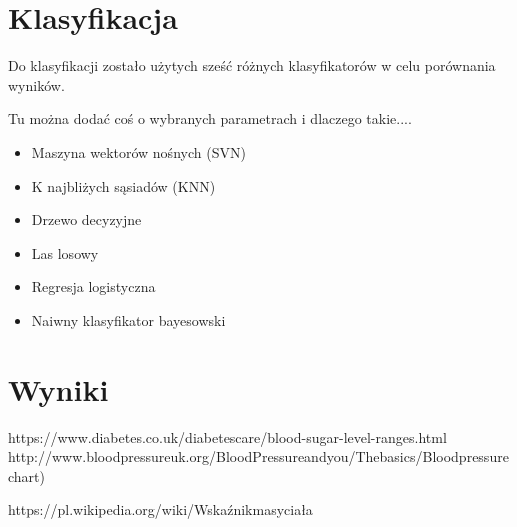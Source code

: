 \documentclass[12pt]{article}
\begin{document}
\section{Klasyfikacja}
	Do klasyfikacji zostało użytych sześć różnych klasyfikatorów w celu porównania wyników.

Tu można dodać coś o wybranych parametrach i dlaczego takie....

\begin{itemize}
\item{Maszyna wektorów nośnych (SVN)}
\item{K najbliżych sąsiadów (KNN)}
\item{Drzewo decyzyjne}
\item{Las losowy}
\item{Regresja logistyczna}
\item{Naiwny klasyfikator bayesowski}

\end{itemize}

\section{Wyniki}


\begin{thebibliography}{9}

	https://www.diabetes.co.uk/diabetescare/blood-sugar-level-ranges.html
	http://www.bloodpressureuk.org/BloodPressureandyou/Thebasics/Bloodpressurechart)

	https://pl.wikipedia.org/wiki/Wskaźnikmasyciała
\end{thebibliography}
\end{document}
